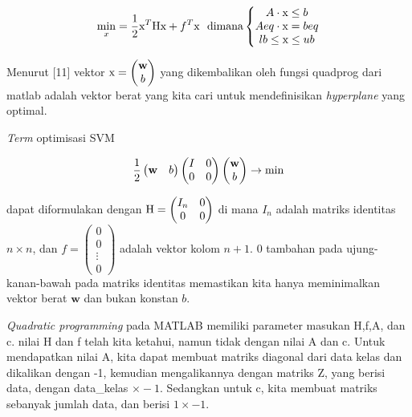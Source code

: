 \documentclass[12pt]{article}%
\begin{document}
\begin{enumerate}
\begin{enumerate}
			\[\min _x = \frac{1}{2} \textup{x}^T \textup{Hx} + f^T\textup{x} \ \ \textup{dimana} \left\{\begin{matrix} A \cdot \textup{x} \leq b\\ Aeq \cdot \textup{x} = beq\\ lb \leq \textup{x} \leq ub \end{matrix}\right.\]

		\par Menurut [11] vektor $\textup{x} = \begin{pmatrix} \textbf{w} \\ b \end{pmatrix}$ yang dikembalikan oleh fungsi quadprog dari matlab adalah vektor berat yang kita cari untuk mendefinisikan \textit{hyperplane} yang optimal.

		\par \textit{Term} optimisasi SVM 

			\[\frac{1}{2} \begin{pmatrix} \textbf{w} & b \end{pmatrix} \begin{pmatrix} I & 0\\ 0 & 0 \end{pmatrix} \begin{pmatrix} \textbf{w}\\ b \end{pmatrix} \rightarrow \textup{min}\]

		\par dapat diformulakan dengan $\textup{H} =  \begin{pmatrix} I_n & 0\\ 0 & 0 \end{pmatrix}$ di mana $I_n$ adalah matriks identitas $n \times n$, dan $f = \begin{pmatrix} 0\\ 0\\ \vdots\\ 0 \end{pmatrix}$ adalah vektor kolom $n+1$. 0 tambahan pada ujung-kanan-bawah pada matriks identitas memastikan kita hanya meminimalkan vektor berat $\textbf{w}$ dan bukan konstan $b$.

		\par \textit{Quadratic programming} pada MATLAB memiliki parameter masukan H,f,A, dan c. nilai H dan f telah kita ketahui, namun tidak dengan nilai A dan c. Untuk mendapatkan nilai A, kita dapat membuat matriks diagonal dari data kelas dan dikalikan dengan -1, kemudian mengalikannya dengan matriks Z, yang berisi data, dengan data\_kelas $\times -1$. Sedangkan untuk c, kita membuat matriks sebanyak jumlah data, dan berisi $1 \times -1 $.


\end{enumerate}
\end{enumerate}
\end{document}
